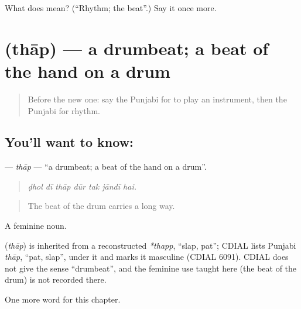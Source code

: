 \begin{tcolorbox}[breakable,colback=teal!4,colframe=teal!35!black,title={Before you move on}]
What does  mean? (\textquotedblleft{}Rhythm; the beat\textquotedblright{}.) Say it once more.
\end{tcolorbox}
\section[\texorpdfstring{\pa{ਥਾਪ} (thāp)}{ਥਾਪ (thāp)}]{ (thāp) — a drumbeat; a beat of the hand on a drum}

\label{lesson:PA-C347-thap}



\begin{quote}
Before the new one: say the Punjabi for to play an instrument, then the Punjabi for rhythm.
\end{quote}

\subsection*{You'll want to know: }
\textbf{} — \emph{thāp} — \textquotedblleft{}a drumbeat; a beat of the hand on a drum\textquotedblright{}.

\begin{quote}
      
\end{quote}

\begin{quote}
\emph{ḍhol dī thāp dūr tak jāndī hai.}
\end{quote}

\begin{quote}
The beat of the drum carries a long way.
\end{quote}

A feminine noun.

\begin{cousinweb}
\textbf{} (\emph{thāp}) is inherited from a reconstructed \emph{*thapp}, \textquotedblleft{}slap, pat\textquotedblright{}; CDIAL lists Punjabi \emph{thāp}, \textquotedblleft{}pat, slap\textquotedblright{}, under it and marks it masculine (CDIAL 6091). CDIAL does not give the sense \textquotedblleft{}drumbeat\textquotedblright{}, and the feminine use taught here (the beat of the drum) is not recorded there.
\end{cousinweb}

\begin{grammarlens}[title={What you've built}]
One more word for this chapter.
\end{grammarlens}

